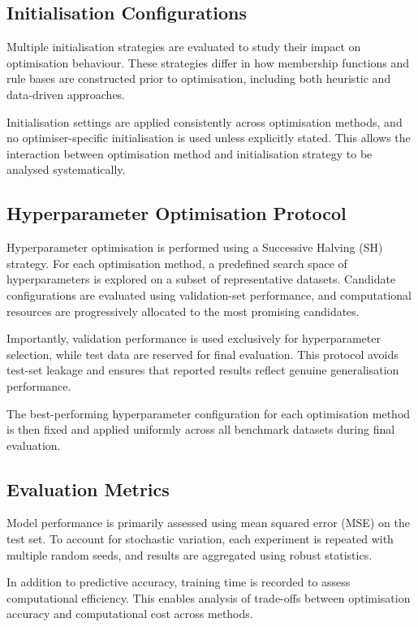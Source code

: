 \documentclass[a4paper,12pt,oneside]{article}
\begin{document}
\subsection{Initialisation Configurations}

Multiple initialisation strategies are evaluated to study their impact on optimisation behaviour. These strategies differ in how membership functions and rule bases are constructed prior to optimisation, including both heuristic and data-driven approaches.

Initialisation settings are applied consistently across optimisation methods, and no optimiser-specific initialisation is used unless explicitly stated. This allows the interaction between optimisation method and initialisation strategy to be analysed systematically.

\subsection{Hyperparameter Optimisation Protocol}

Hyperparameter optimisation is performed using a Successive Halving (SH) strategy. For each optimisation method, a predefined search space of hyperparameters is explored on a subset of representative datasets. Candidate configurations are evaluated using validation-set performance, and computational resources are progressively allocated to the most promising candidates.

Importantly, validation performance is used exclusively for hyperparameter selection, while test data are reserved for final evaluation. This protocol avoids test-set leakage and ensures that reported results reflect genuine generalisation performance.

The best-performing hyperparameter configuration for each optimisation method is then fixed and applied uniformly across all benchmark datasets during final evaluation.

\subsection{Evaluation Metrics}

Model performance is primarily assessed using mean squared error (MSE) on the test set. To account for stochastic variation, each experiment is repeated with multiple random seeds, and results are aggregated using robust statistics.

In addition to predictive accuracy, training time is recorded to assess computational efficiency. This enables analysis of trade-offs between optimisation accuracy and computational cost across methods.
\end{document}
